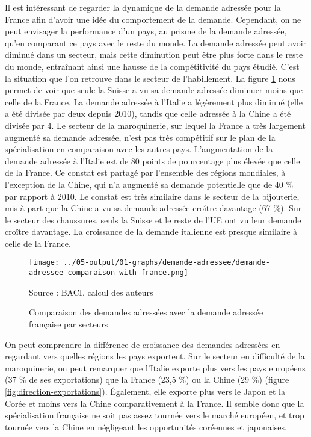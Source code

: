 \documentclass[french,10pt,a4paper]{article}
\begin{document}
Il est intéressant de regarder la dynamique de la demande adressée pour la France afin d'avoir une idée du comportement de la demande. Cependant, on ne peut envisager la performance d'un pays, au prisme de la demande adressée, qu'en comparant ce pays avec le reste du monde. La demande adressée peut avoir diminué dans un secteur, mais cette diminution peut être plus forte dans le reste du monde, entraînant ainsi une hausse de la compétitivité du pays étudié. C'est la situation que l'on retrouve dans le secteur de l'habillement. La figure \ref{fig:demande-adressee} nous permet de voir que seule la Suisse a vu sa demande adressée diminuer moins que celle de la France. La demande adressée à l'Italie a légèrement plus diminué (elle a été divisée par deux depuis 2010), tandis que celle adressée à la Chine a été divisée par 4. Le secteur de la maroquinerie, sur lequel la France a très largement augmenté sa demande adressée, n'est pas très compétitif sur le plan de la spécialisation en comparaison avec les autres pays. L'augmentation de la demande adressée à l'Italie est de 80 points de pourcentage plus élevée que celle de la France. Ce constat est partagé par l'ensemble des régions mondiales, à l'exception de la Chine, qui n'a augmenté sa demande potentielle que de 40 \% par rapport à 2010. Le constat est très similaire dans le secteur de la bijouterie, mis à part que la Chine a vu sa demande adressée croître davantage (67 \%). Sur le secteur des chaussures, seuls la Suisse et le reste de l'UE ont vu leur demande croître davantage. La croissance de la demande italienne est presque similaire à celle de la France.

\begin{figure}[!h]
  \centering
  \texttt{[image: ../05-output/01-graphs/demande-adressee/demande-adressee-comparaison-with-france.png]}
  \captionsetup{justification=raggedright,singlelinecheck=false, font=small}
  \caption*{Source : BACI, calcul des auteurs}
  \captionsetup{justification=centering, singlelinecheck=true, font=normalsize}
  \caption{Comparaison des demandes adressées avec la demande adressée française par secteurs}
  \label{fig:demande-adressee}
\end{figure}

\bigskip
On peut comprendre la différence de croissance des demandes adressées en regardant vers quelles régions les pays exportent. Sur le secteur en difficulté de la maroquinerie, on peut remarquer que l'Italie exporte plus vers les pays européens (37 \% de ses exportations) que la France (23,5 \%) ou la Chine (29 \%) (figure \ref{fig:direction-exportations}). Également, elle exporte plus vers le Japon et la Corée et moins vers la Chine comparativement à la France. Il semble donc que la spécialisation française ne soit pas assez tournée vers le marché européen, et trop tournée vers la Chine en négligeant les opportunités coréennes et japonaises. 
\end{document}
